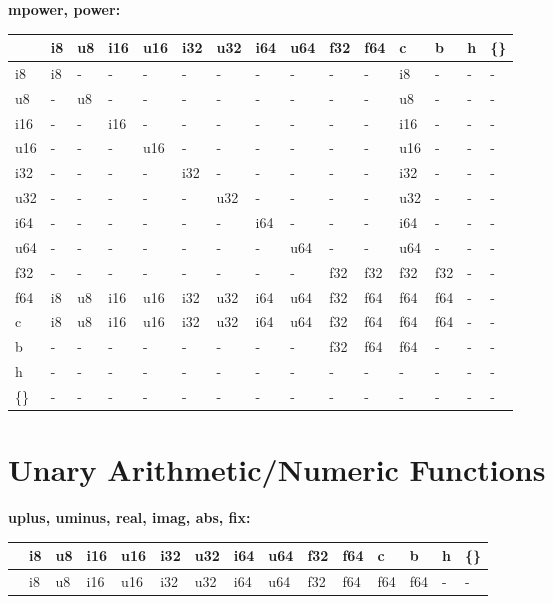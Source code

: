 \newpage
\textbf{mpower, power:}
\begin{scriptsize}\begin{tt}\begin{center}\vspace{-.3cm}\begin{tabular}{|m{.65cm}||m{.65cm}|m{.65cm}|m{.65cm}|m{.65cm}|m{.65cm}|m{.65cm}|m{.65cm}|m{.65cm}|m{.65cm}|m{.65cm}|m{.65cm}|m{.65cm}|m{.65cm}|m{.65cm}|}\hline 
&i8&u8&i16&u16&i32&u32&i64&u64&f32&f64&c&b&h&\{\}\\ \hline \hline
i8&i8&-&-&-&-&-&-&-&-&-&i8&-&-&-\\ \hline
u8&-&u8&-&-&-&-&-&-&-&-&u8&-&-&-\\ \hline
i16&-&-&i16&-&-&-&-&-&-&-&i16&-&-&-\\ \hline
u16&-&-&-&u16&-&-&-&-&-&-&u16&-&-&-\\ \hline
i32&-&-&-&-&i32&-&-&-&-&-&i32&-&-&-\\ \hline
u32&-&-&-&-&-&u32&-&-&-&-&u32&-&-&-\\ \hline
i64&-&-&-&-&-&-&i64&-&-&-&i64&-&-&-\\ \hline
u64&-&-&-&-&-&-&-&u64&-&-&u64&-&-&-\\ \hline
f32&-&-&-&-&-&-&-&-&f32&f32&f32&f32&-&-\\ \hline
f64&i8&u8&i16&u16&i32&u32&i64&u64&f32&f64&f64&f64&-&-\\ \hline
c&i8&u8&i16&u16&i32&u32&i64&u64&f32&f64&f64&f64&-&-\\ \hline
b&-&-&-&-&-&-&-&-&f32&f64&f64&-&-&-\\ \hline
h&-&-&-&-&-&-&-&-&-&-&-&-&-&-\\ \hline
\{\}&-&-&-&-&-&-&-&-&-&-&-&-&-&-\\ \hline
\end{tabular}\end{center}\end{tt}\end{scriptsize} 




\section{Unary Arithmetic/Numeric Functions}

\textbf{uplus, uminus, real, imag, abs, fix:}
\begin{scriptsize}\begin{tt}\begin{center}\vspace{-.3cm}\begin{tabular}{|m{.65cm}||m{.65cm}|m{.65cm}|m{.65cm}|m{.65cm}|m{.65cm}|m{.65cm}|m{.65cm}|m{.65cm}|m{.65cm}|m{.65cm}|m{.65cm}|m{.65cm}|m{.65cm}|m{.65cm}|}\hline 
&i8&u8&i16&u16&i32&u32&i64&u64&f32&f64&c&b&h&\{\}\\ \hline \hline
&i8&u8&i16&u16&i32&u32&i64&u64&f32&f64&f64&f64&-&-\\ \hline
\end{tabular}\end{center}\end{tt}\end{scriptsize} 

